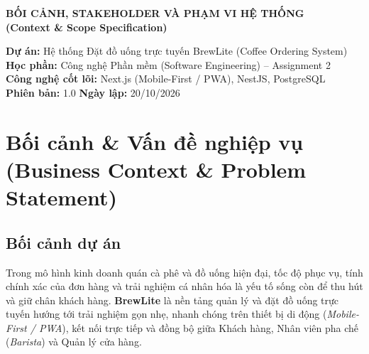 \documentclass[12pt,a4paper]{article}
\begin{document}
\begin{center}
    {\LARGE \textbf{\textcolor{brandblue}{BỐI CẢNH, STAKEHOLDER VÀ PHẠM VI HỆ THỐNG}}}\\[0.3cm]
    {\large \textbf{(Context \& Scope Specification)}}\\[0.5cm]
    \begin{tcolorbox}[colback=lightgray,colframe=brandblue,arc=3mm,width=0.95\textwidth]
        \small
        \textbf{Dự án:} Hệ thống Đặt đồ uống trực tuyến BrewLite (Coffee Ordering System)\\
        \textbf{Học phần:} Công nghệ Phần mềm (Software Engineering) -- Assignment 2\\
        \textbf{Công nghệ cốt lõi:} Next.js (Mobile-First / PWA), NestJS, PostgreSQL\\
        \textbf{Phiên bản:} 1.0 \hfill \textbf{Ngày lập:} 20/10/2026
    \end{tcolorbox}
\end{center}

\vspace{0.3cm}

\section{Bối cảnh \& Vấn đề nghiệp vụ (Business Context \& Problem Statement)}

\subsection{Bối cảnh dự án}
Trong mô hình kinh doanh quán cà phê và đồ uống hiện đại, tốc độ phục vụ, tính chính xác của đơn hàng và trải nghiệm cá nhân hóa là yếu tố sống còn để thu hút và giữ chân khách hàng. \textbf{BrewLite} là nền tảng quản lý và đặt đồ uống trực tuyến hướng tới trải nghiệm gọn nhẹ, nhanh chóng trên thiết bị di động (\textit{Mobile-First / PWA}), kết nối trực tiếp và đồng bộ giữa Khách hàng, Nhân viên pha chế (\textit{Barista}) và Quản lý cửa hàng.
\end{document}
